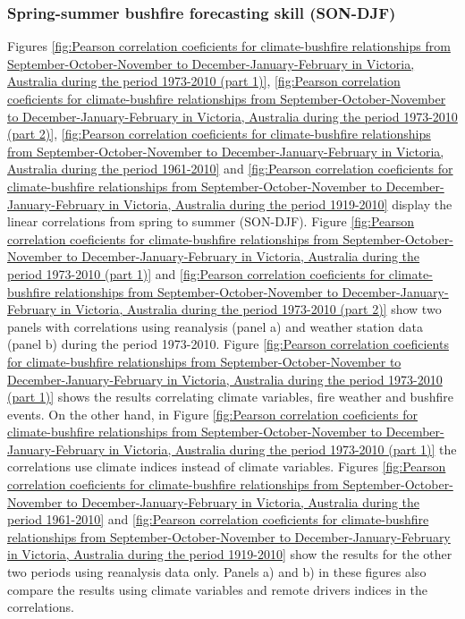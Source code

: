 \subsubsection{Spring-summer bushfire forecasting skill (SON-DJF)}

Figures \ref{fig:Pearson correlation coeficients for climate-bushfire relationships from September-October-November to December-January-February in Victoria, Australia during the period 1973-2010 (part 1)},
\ref{fig:Pearson correlation coeficients for climate-bushfire relationships from September-October-November to December-January-February in Victoria, Australia during the period 1973-2010 (part 2)},
\ref{fig:Pearson correlation coeficients for climate-bushfire relationships from September-October-November to December-January-February in Victoria, Australia during the period 1961-2010}
and \ref{fig:Pearson correlation coeficients for climate-bushfire relationships from September-October-November to December-January-February in Victoria, Australia during the period 1919-2010}
display the linear correlations from spring to summer (SON-DJF). Figure
\ref{fig:Pearson correlation coeficients for climate-bushfire relationships from September-October-November to December-January-February in Victoria, Australia during the period 1973-2010 (part 1)}
and \ref{fig:Pearson correlation coeficients for climate-bushfire relationships from September-October-November to December-January-February in Victoria, Australia during the period 1973-2010 (part 2)}
show two panels with correlations using reanalysis (panel a) and weather
station data (panel b) during the period 1973-2010. Figure \ref{fig:Pearson correlation coeficients for climate-bushfire relationships from September-October-November to December-January-February in Victoria, Australia during the period 1973-2010 (part 1)}
shows the results correlating climate variables, fire weather and
bushfire events. On the other hand, in Figure \ref{fig:Pearson correlation coeficients for climate-bushfire relationships from September-October-November to December-January-February in Victoria, Australia during the period 1973-2010 (part 1)}
the correlations use climate indices instead of climate variables.
Figures \ref{fig:Pearson correlation coeficients for climate-bushfire relationships from September-October-November to December-January-February in Victoria, Australia during the period 1961-2010}
and \ref{fig:Pearson correlation coeficients for climate-bushfire relationships from September-October-November to December-January-February in Victoria, Australia during the period 1919-2010}
show the results for the other two periods using reanalysis data only.
Panels a) and b) in these figures also compare the results using climate
variables and remote drivers indices in the correlations.

